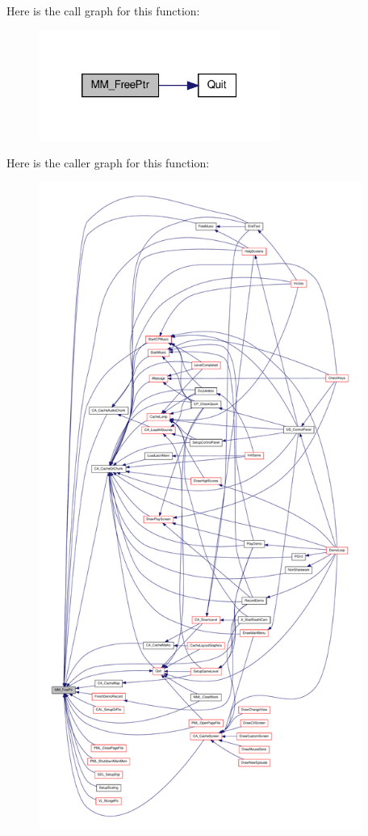 Here is the call graph for this function:
\nopagebreak
\begin{figure}[H]
\begin{center}
\leavevmode
\includegraphics[width=224pt]{ID__MM_8H_a9464693cb68e9a8ed7586855952f197a_cgraph}
\end{center}
\end{figure}




Here is the caller graph for this function:
\nopagebreak
\begin{figure}[H]
\begin{center}
\leavevmode
\includegraphics[height=600pt]{ID__MM_8H_a9464693cb68e9a8ed7586855952f197a_icgraph}
\end{center}
\end{figure}


